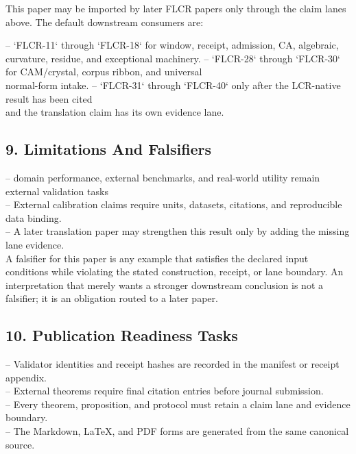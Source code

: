 \documentclass[11pt]{article}
\begin{document}
This paper may be imported by later FLCR papers only through the claim lanes
above. The default downstream consumers are:

\noindent{}-- `FLCR-11` through `FLCR-18` for window, receipt, admission, CA, algebraic,\\
  curvature, residue, and exceptional machinery.
\noindent{}-- `FLCR-28` through `FLCR-30` for CAM/crystal, corpus ribbon, and universal\\
  normal-form intake.
\noindent{}-- `FLCR-31` through `FLCR-40` only after the LCR-native result has been cited\\
  and the translation claim has its own evidence lane.

\subsection*{9. Limitations And Falsifiers}

\noindent{}-- domain performance, external benchmarks, and real-world utility remain external validation tasks\\
\noindent{}-- External calibration claims require units, datasets, citations, and reproducible data binding.\\
\noindent{}-- A later translation paper may strengthen this result only by adding the missing lane evidence.\\

A falsifier for this paper is any example that satisfies the declared input
conditions while violating the stated construction, receipt, or lane boundary.
An interpretation that merely wants a stronger downstream conclusion is not a
falsifier; it is an obligation routed to a later paper.

\subsection*{10. Publication Readiness Tasks}

\noindent{}-- Validator identities and receipt hashes are recorded in the manifest or receipt appendix.\\
\noindent{}-- External theorems require final citation entries before journal submission.\\
\noindent{}-- Every theorem, proposition, and protocol must retain a claim lane and evidence boundary.\\
\noindent{}-- The Markdown, LaTeX, and PDF forms are generated from the same canonical source.\\
\end{document}
